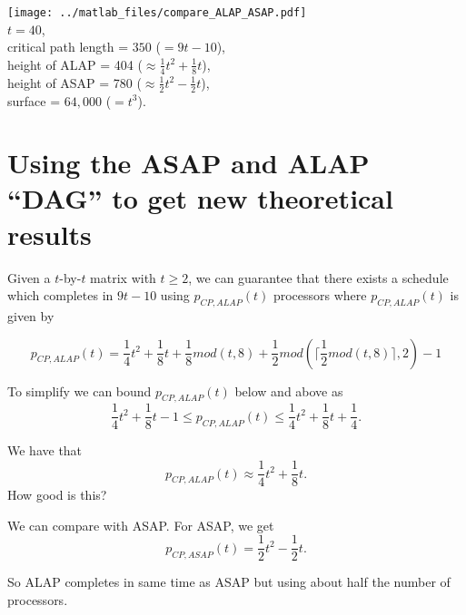 \begin{frame}

\texttt{[image: ../matlab\_files/compare\_ALAP\_ASAP.pdf]}\\
\scriptsize
$t=40$, \\
critical path length = $350$ ($= 9t-10$),\\
height of ALAP = 404 ($\approx \frac{1}{4}t^2 +\frac{1}{8}t$),\\
height of ASAP = 780 ($\approx \frac{1}{2}t^2 -\frac{1}{2}t$),\\
surface = $64,000$ ($=t^3$).


\end{frame}

\section{Using the ASAP and ALAP ``DAG'' to get new theoretical results}



\begin{frame}

Given a $t$-by-$t$ matrix with $t\geq2$,
we can guarantee that there exists a schedule which completes in $9t-10$
using $p_{CP,ALAP}(t)$ processors where $p_{CP,ALAP}(t)$ is given by

$$
p_{CP,ALAP}(t) = 
\frac{1}{4}t^2 +\frac{1}{8}t
 +\frac{1}{8}mod(t,8) + \frac{1}{2} mod( \lceil \frac{1}{2} mod(t,8) \rceil ,2)-1
$$

To simplify we can bound $p_{CP,ALAP}(t)$ below and above as
$$
\frac{1}{4}t^2 +\frac{1}{8}t -1
\leq  p_{CP,ALAP}(t) \leq 
\frac{1}{4}t^2 +\frac{1}{8}t + \frac{1}{4}.
$$



\end{frame}



\begin{frame}

We have that
$$ p_{CP,ALAP}(t) \approx \frac{1}{4}t^2 +\frac{1}{8}t .$$
How good is this?

We can compare with ASAP. For ASAP, we get
$$ p_{CP,ASAP}(t) = \frac{1}{2}t^2 -\frac{1}{2}t .$$

So ALAP completes in same time as ASAP but using about half the number of processors.


\end{frame}



